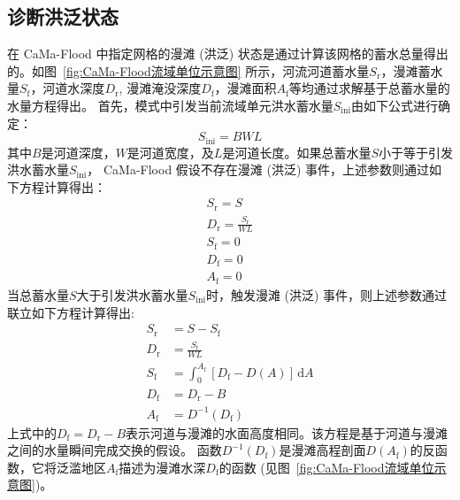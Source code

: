 \subsection{诊断洪泛状态}\label{诊断洪泛状态}
在 CaMa-Flood 中指定网格的漫滩 (洪泛) 状态是通过计算该网格的蓄水总量得出的。如图~\ref{fig:CaMa-Flood流域单位示意图}
所示，河流河道蓄水量$S_{\mathrm {r}} $，漫滩蓄水量$S_{\mathrm {f}} $，河道水深度$D_{\mathrm {r}} $, 漫滩淹没深度$D_{\mathrm {f}} $，漫滩面积$A_{\mathrm {f}} $等均通过求解基于总蓄水量的水量方程得出。
首先，模式中引发当前流域单元洪水蓄水量$S_{\mathrm{ini}}$由如下公式进行确定：
\begin{equation}
  S_{\mathrm{ ini }}=B WL
\end{equation}
其中$B$是河道深度，$W$是河道宽度，及$L$是河道长度。如果总蓄水量$S$小于等于引发洪水蓄水量$S_{\mathrm{ini}}$，
CaMa-Flood 假设不存在漫滩 (洪泛) 事件，上述参数则通过如下方程计算得出：
\begin{equation}
  \begin{array}{l}S_{\mathrm {r}} =S \\ D_{\mathrm {r}} =\frac{S_{\mathrm {r}} }{WL} \\ S_{\mathrm {f}} =0 \\ D_{\mathrm {f}} =0 \\ A_{\mathrm {f}} =0 \end{array}
\end{equation}
当总蓄水量$S$大于引发洪水蓄水量$S_{\mathrm{ini}}$时，触发漫滩 (洪泛) 事件，则上述参数通过联立如下方程计算得出:
\begin{equation}
  \begin{aligned}
    S_{\mathrm {r}}  &=S-S_{\mathrm {f}}  \\
    D_{\mathrm {r}}  &=\frac{S_{\mathrm {r}} }{W L} \\
    S_{\mathrm {f}}  &=\int_{0}^{A_{\mathrm {f}} }[D_{\mathrm {f}} -D(A)]\,\mathrm{d}A  \\
    D_{\mathrm {f}}  &=D_{\mathrm {r}} -B \\
    A_{\mathrm {f}}  &=D^{-1}(D_{\mathrm {f}} )
  \end{aligned}
\end{equation}
上式中的$D_{\mathrm {f}}  = D_{\mathrm {r}}  - B$表示河道与漫滩的水面高度相同。该方程是基于河道与漫滩之间的水量瞬间完成交换的假设。
函数$D^{-1}(D_{\mathrm {f}} )$是漫滩高程剖面$D(A_{\mathrm {f}} )$的反函数，它将泛滥地区$A_{\mathrm {f}} $描述为漫滩水深$D_{\mathrm {f}} $的函数 (见图~\ref{fig:CaMa-Flood流域单位示意图})。


